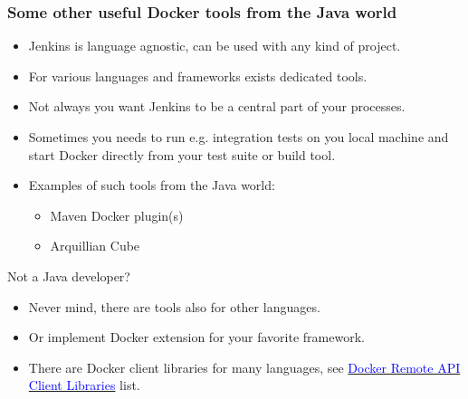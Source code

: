 \documentclass[10pt,utf8]{beamer}
\begin{document}
\begin{frame}
	\frametitle{Some other useful Docker tools from the Java world}
	\begin{itemize}
		\item Jenkins is language agnostic, can be used with any kind of project.
		\item For various languages and frameworks exists dedicated tools.
		\item Not always you want Jenkins to be a central part of your processes.
		\item Sometimes you needs to run e.g. integration tests on you local machine and start Docker directly from your test suite or build tool.
		\item Examples of such tools from the Java world:
		\begin{itemize}
		 \item Maven Docker plugin(s)
		 \item Arquillian Cube
		\end{itemize}
	\end{itemize}
	
	\vspace{0.5cm}
	
	Not a Java developer?\\
	\begin{itemize}
		\item Never mind, there are tools also for other languages.
		\item Or implement Docker extension for your favorite framework.
		\item There are Docker client libraries for many languages, see \href{https://docs.docker.com/reference/api/remote_api_client_libraries/}{\textcolor{blue}{Docker Remote API Client Libraries}} list.
	\end{itemize}
\end{frame}
\end{document}
